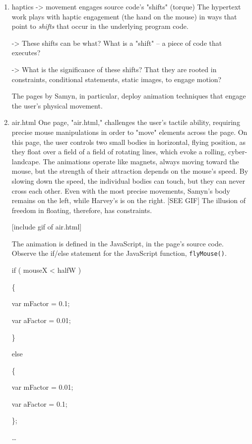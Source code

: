 \documentclass[11pt]{article}
\begin{document}
\begin{enumerate}
\item haptics -> movement engages source code's "shifts" (torque)
\label{sec:org9962af0}
The hypertext work plays with haptic engagement (the hand on the
mouse) in ways that point to \emph{shifts} that occur in the underlying
program code. 

-> These shifts can be what? What is a "shift" -- a piece of code that
executes?  

-> What is the significance of these shifts? That they are rooted in
constraints, conditional statements, static images, to engage motion?

The pages by Samyn, in particular, deploy animation techniques that
engage the user's physical movement. 

\item air.html
\label{sec:org396c8b7}
One page, "air.html," challenges the user's tactile ability, requiring
precise mouse manipulations in order to "move" elements across the
page. On this page, the user controls two small bodies in horizontal,
flying position, as they float over a field of a field of rotating
lines, which evoke a rolling, cyber-landcape. The animations operate
like magnets, always moving toward the mouse, but the strength of
their attraction depends on the mouse's speed. By slowing down the
speed, the individual bodies can touch, but they can never cross each
other. Even with the most precise movements, Samyn's body remains on
the left, while Harvey's is on the right. [SEE GIF] The illusion of
freedom in floating, therefore, has constraints.

[include gif of air.html]

The animation is defined in the JavaScript, in the page's source code.
Observe the if/else statement for the JavaScript function,
\texttt{flyMouse()}.

\begin{SOURCE}


if ( mouseX < halfW )

\{

var mFactor = 0.1;

var aFactor = 0.01;

\}

else

\{

var mFactor = 0.01;

var aFactor = 0.1;

\};

\ldots{}


\end{SOURCE}
\end{enumerate}
\end{document}
